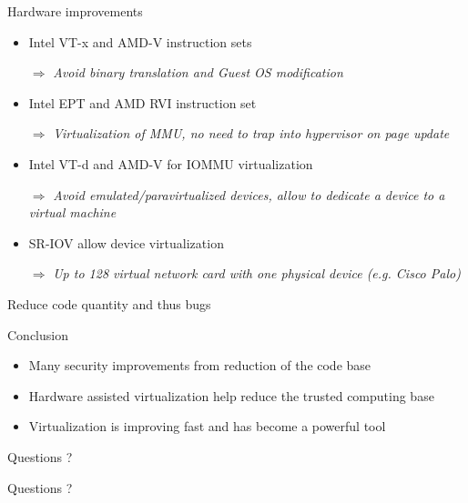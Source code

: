 \documentclass{beamer}
\begin{document}
\begin{frame}{Hardware improvements}
	\begin{itemize}
	\item Intel VT-x and AMD-V instruction sets
	\item[$\Rightarrow$] \emph{Avoid binary translation and Guest OS modification}\\
	\item Intel EPT and AMD RVI instruction set
	\item[$\Rightarrow$] \emph{Virtualization of MMU, no need to trap into hypervisor on page update}\\
	\item Intel VT-d and AMD-V for IOMMU virtualization
	\item[$\Rightarrow$] \emph{Avoid emulated/paravirtualized devices, allow to dedicate a device to a virtual machine}\\
	\item SR-IOV allow device virtualization
	\item[$\Rightarrow$] \emph{Up to 128 virtual network card with one physical device (e.g. Cisco Palo)}
	\end{itemize}
	\alert{Reduce code quantity and thus bugs}
\end{frame}

\begin{frame}{Conclusion}
	\begin{itemize}
	\item Many security improvements from reduction of the code base
	\item Hardware assisted virtualization help reduce the trusted computing base
	\item Virtualization is improving fast and has become a powerful tool
	\end{itemize}
\end{frame}

\begin{frame}{Questions ?}
		\begin{center}
		Questions ?
		\end{center}
\end{frame}
\end{document}
